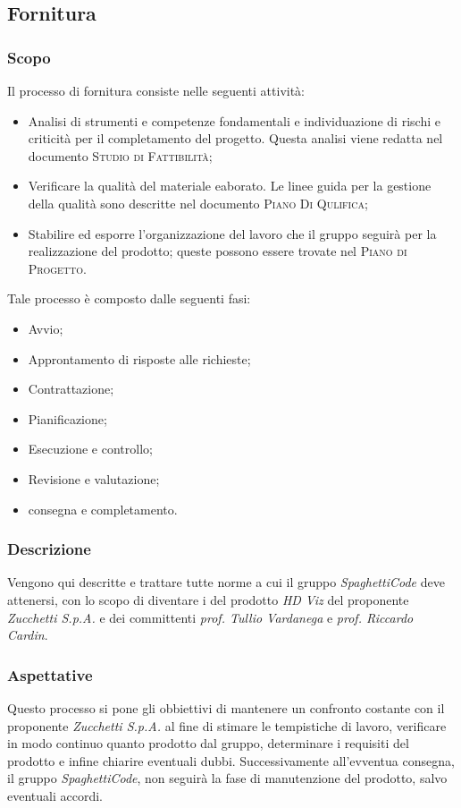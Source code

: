 \documentclass[../norme-di-progetto.tex]{subfiles}
\begin{document}
    
\subsection{Fornitura}
\subsubsection{Scopo}
Il processo di fornitura consiste nelle seguenti attività:
\begin{itemize}
    \item Analisi di strumenti e competenze fondamentali e individuazione di rischi e criticità per il completamento del progetto. Questa analisi viene redatta nel documento \textsc{Studio di Fattibilità};
    \item Verificare la qualità del materiale eaborato. Le linee guida per la gestione della qualità sono descritte nel documento \textsc{Piano Di Qulifica};
    \item Stabilire ed esporre l'organizzazione del lavoro che il gruppo seguirà per la realizzazione del prodotto; queste possono essere trovate nel \textsc{Piano di Progetto}.
\end{itemize}

\setlength{\parindent}{0pt}Tale processo è composto dalle seguenti fasi:
\begin{itemize}
    \item Avvio;
    \item Approntamento di risposte alle richieste;
    \item Contrattazione;
    \item Pianificazione;
    \item Esecuzione e controllo;
    \item Revisione e valutazione;
    \item consegna e completamento.
\end{itemize}

\subsubsection{Descrizione}
Vengono qui descritte e trattare tutte norme a cui il gruppo \emph{SpaghettiCode} deve attenersi, con lo scopo di diventare i  del prodotto \emph{HD Viz} del proponente \emph{Zucchetti S.p.A.} e dei committenti \emph{prof. Tullio Vardanega} e \emph{prof. Riccardo Cardin}.

\subsubsection{Aspettative}
Questo processo si pone gli obbiettivi di mantenere un confronto costante con il proponente \emph{Zucchetti S.p.A.} al fine di stimare le tempistiche di lavoro, verificare in modo continuo quanto prodotto dal gruppo, determinare i requisiti del prodotto e infine chiarire eventuali dubbi.
Successivamente all'evventua consegna, il gruppo \emph{SpaghettiCode}, non seguirà la fase di manutenzione del prodotto, salvo eventuali accordi.
\end{document}
